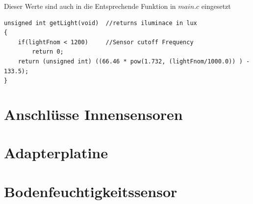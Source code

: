 \documentclass[12pt, a4paper, oneside]{report}
\begin{document}
Dieser Werte sind auch in die Entsprechende Funktion in $main.c$ eingesetzt
\begin{lstlisting}
unsigned int getLight(void)  //returns iluminace in lux
{
	if(lightFnom < 1200)     //Sensor cutoff Frequency
		return 0;
	return (unsigned int) ((66.46 * pow(1.732, (lightFnom/1000.0)) ) - 133.5);
}
\end{lstlisting}

\section{Anschlüsse Innensensoren}
\label{sec:Innensensoren}

\section{Adapterplatine}
\label{sec:Adapterplatine}

\section{Bodenfeuchtigkeitssensor}
\label{sec:Bodenfeuchtigkeitssensor}
\end{document}
